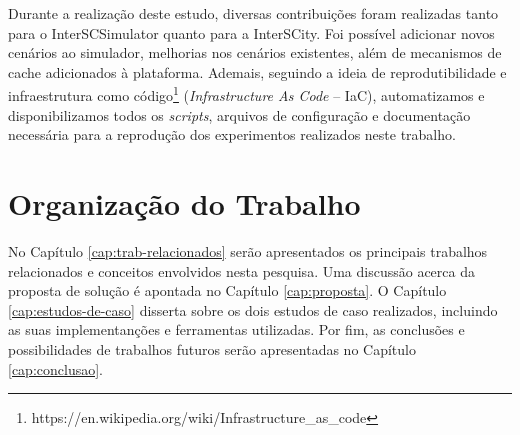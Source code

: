 Durante a realização deste estudo, diversas contribuições foram realizadas tanto para o InterSCSimulator quanto para a InterSCity.
Foi possível adicionar novos cenários ao simulador, melhorias nos cenários existentes, além de mecanismos de cache adicionados à plataforma.
Ademais, seguindo a ideia de reprodutibilidade e infraestrutura como código\footnote{https://en.wikipedia.org/wiki/Infrastructure\_as\_code} (\textit{Infrastructure As Code} -- IaC), automatizamos e
disponibilizamos todos os \textit{scripts}, arquivos de configuração e documentação necessária para a reprodução dos experimentos realizados neste trabalho.


\section{Organização do Trabalho}

No Capítulo \ref{cap:trab-relacionados} serão apresentados os principais trabalhos relacionados e conceitos envolvidos nesta pesquisa.
Uma discussão acerca da proposta de solução é apontada no Capítulo \ref{cap:proposta}.
O Capítulo \ref{cap:estudos-de-caso} disserta sobre os dois estudos de caso realizados, incluindo as suas implementanções e ferramentas utilizadas.
Por fim, as conclusões e possibilidades de trabalhos futuros serão apresentadas no Capítulo \ref{cap:conclusao}.
